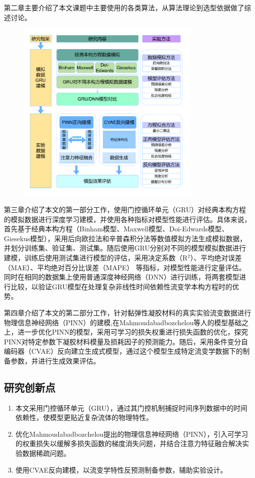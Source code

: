 第二章主要介绍了本文课题中主要使用的各类算法，从算法理论到选型依据做了综述讨论。
\begin{figure}[htbp]
  \centering
  \includegraphics[width=0.8\textwidth]{Fig/HolisticResearchFramework.drawio.pdf}
\end{figure}
第三章介绍了本文的第一部分工作，使用门控循环单元（GRU）对经典本构方程的模拟数据进行深度学习建模，并使用各种指标对模型性能进行评估。具体来说，首先基于经典本构方程（Binham模型、Maxwell模型、Doi-Edwards模型、Giesekus模型），采用后向欧拉法和辛普森积分法等数值模拟方法生成模拟数据，并划分训练集、验证集、测试集。随后使用GRU分别对不同的模型模拟数据进行建模，训练后使用测试集进行模型的评估，采用决定系数（R$^2$）、平均绝对误差（MAE）、平均绝对百分比误差（MAPE）
等指标，对模型性能进行定量评估。同时在相同的数据集上使用普通深度神经网络（DNN）进行训练，将两套模型进行比较，以验证GRU模型在处理复杂非线性时间依赖性流变学本构方程时的优势。

第四章介绍了本文的第二部分工作，针对黏弹性凝胶材料的真实实验流变数据进行物理信息神经网络（PINN）的建模,在Mahmoudabadbozchelou等人的模型基础之上，进一步优化PINN的模型，采用可学习的损失权重进行损失函数的优化，探究PINN对特定参数下凝胶材料模量及损耗因子的预测能力。随后，采用条件变分自编码器（CVAE）反向建立生成式模型，通过这个模型生成特定流变学数据下的制备参数，并进行生成效果评估。

\subsection{研究创新点}
\begin{enumerate}[topsep = 0 pt, itemsep= 0 pt, parsep=0pt, partopsep=0pt, leftmargin=44pt, itemindent=0pt, labelsep=6pt, label=(\arabic*)]
  \item 本文采用门控循环单元（GRU），通过其门控机制捕捉时间序列数据中的时间依赖性，使模型更贴近复杂流体的物理特性。
  \item 优化Mahmoudabadbozchelou提出的物理信息神经网络（PINN），引入可学习的权重损失以缓解多损失函数的梯度消失问题，并结合注意力特征融合解决实验数据稀疏问题。
  \item 使用CVAE反向建模，以流变学特性反预测制备参数，辅助实验设计。
\end{enumerate}
